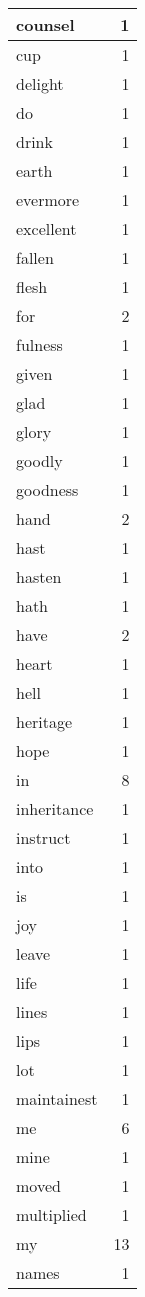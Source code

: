 \begin{center}
\begin{longtable}{l|r}
counsel & 1 \\ \hline
cup & 1 \\ \hline
delight & 1 \\ \hline
do & 1 \\ \hline
drink & 1 \\ \hline
earth & 1 \\ \hline
evermore & 1 \\ \hline
excellent & 1 \\ \hline
fallen & 1 \\ \hline
flesh & 1 \\ \hline
for & 2 \\ \hline
fulness & 1 \\ \hline
given & 1 \\ \hline
glad & 1 \\ \hline
glory & 1 \\ \hline
goodly & 1 \\ \hline
goodness & 1 \\ \hline
hand & 2 \\ \hline
hast & 1 \\ \hline
hasten & 1 \\ \hline
hath & 1 \\ \hline
have & 2 \\ \hline
heart & 1 \\ \hline
hell & 1 \\ \hline
heritage & 1 \\ \hline
hope & 1 \\ \hline
in & 8 \\ \hline
inheritance & 1 \\ \hline
instruct & 1 \\ \hline
into & 1 \\ \hline
is & 1 \\ \hline
joy & 1 \\ \hline
leave & 1 \\ \hline
life & 1 \\ \hline
lines & 1 \\ \hline
lips & 1 \\ \hline
lot & 1 \\ \hline
maintainest & 1 \\ \hline
me & 6 \\ \hline
mine & 1 \\ \hline
moved & 1 \\ \hline
multiplied & 1 \\ \hline
my & 13 \\ \hline
names & 1 \\ \hline

\end{longtable}
\end{center}

